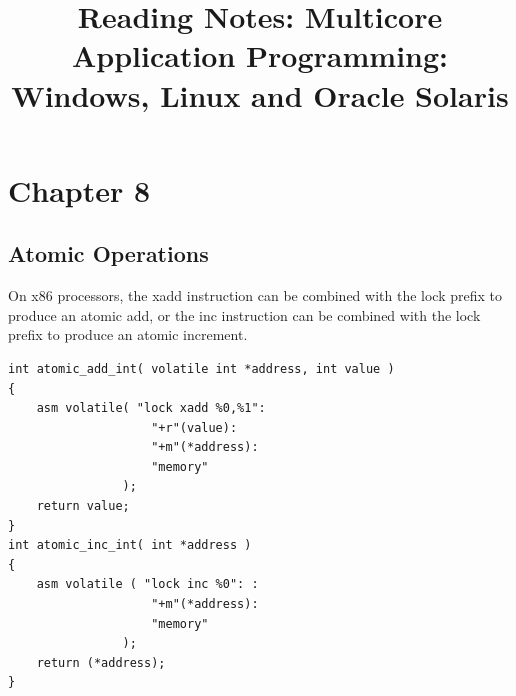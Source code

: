 \documentclass[12pt,a4paper]{report}
\title{Reading Notes: Multicore Application Programming: Windows, Linux and Oracle Solaris}
\begin{document}
\maketitle

\section*{Chapter 8}
\subsection*{Atomic Operations}
On x86 processors, the xadd instruction can be combined with the lock prefix to produce an atomic add, or the inc instruction can be combined with the lock prefix to produce an atomic increment.
\begin{lstlisting}
int atomic_add_int( volatile int *address, int value )
{
	asm volatile( "lock xadd %0,%1":
					"+r"(value):
					"+m"(*address):
					"memory" 
				);
	return value;
}
int atomic_inc_int( int *address )
{
	asm volatile ( "lock inc %0": :
					"+m"(*address):
					"memory" 
				);
	return (*address);
}
\end{lstlisting}
\end{document}
